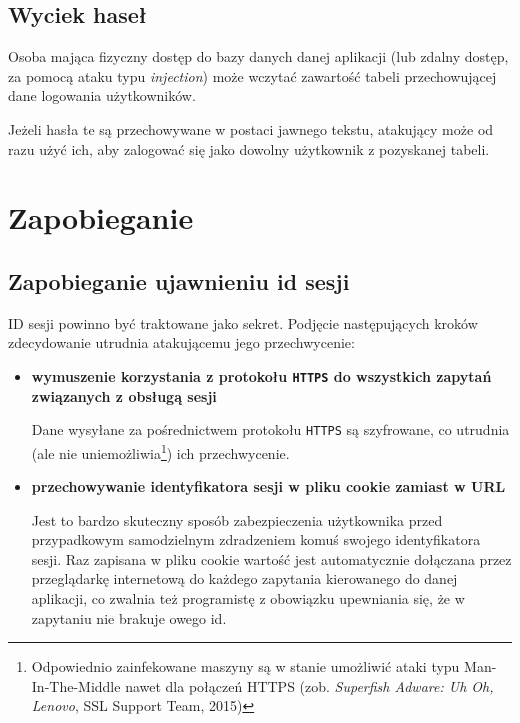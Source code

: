 \documentclass[12pt,polish,a4paper,]{report}
\begin{document}
\subsection{Wyciek haseł}\label{wyciek-haseux142}

Osoba mająca fizyczny dostęp do bazy danych danej aplikacji (lub zdalny
dostęp, za pomocą ataku typu \emph{injection}) może wczytać zawartość
tabeli przechowującej dane logowania użytkowników.

Jeżeli hasła te są przechowywane w postaci jawnego tekstu, atakujący
może od razu użyć ich, aby zalogować się jako dowolny użytkownik z
pozyskanej tabeli.

\section{Zapobieganie}\label{zapobieganie-1}

\subsection{Zapobieganie ujawnieniu id
sesji}\label{zapobieganie-ujawnieniu-id-sesji}

ID sesji powinno być traktowane jako sekret. Podjęcie następujących
kroków zdecydowanie utrudnia atakującemu jego przechwycenie:

\begin{itemize}
\item
  \textbf{wymuszenie korzystania z protokołu \texttt{HTTPS} do
  wszystkich zapytań związanych z obsługą sesji}

  Dane wysyłane za pośrednictwem protokołu \texttt{HTTPS} są szyfrowane,
  co utrudnia (ale nie uniemożliwia\footnote{Odpowiednio zainfekowane
    maszyny są w stanie umożliwić ataki typu Man-In-The-Middle nawet dla
    połączeń HTTPS (zob. \emph{Superfish Adware: Uh Oh, Lenovo}, SSL
    Support Team, 2015)}) ich przechwycenie.
\end{itemize}

\begin{itemize}
\item
  \textbf{przechowywanie identyfikatora sesji w pliku cookie zamiast w
  URL}

  Jest to bardzo skuteczny sposób zabezpieczenia użytkownika przed
  przypadkowym samodzielnym zdradzeniem komuś swojego identyfikatora
  sesji. Raz zapisana w pliku cookie wartość jest automatycznie
  dołączana przez przeglądarkę internetową do każdego zapytania
  kierowanego do danej aplikacji, co zwalnia też programistę z obowiązku
  upewniania się, że w zapytaniu nie brakuje owego id.
\end{itemize}
\end{document}
